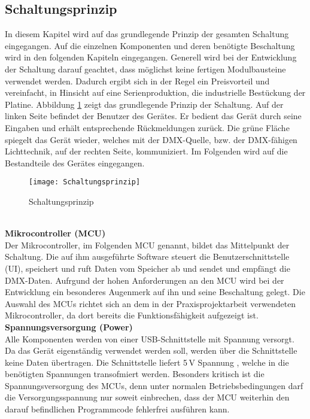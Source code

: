 
\subsection{Schaltungsprinzip}

In diesem Kapitel wird auf das grundlegende Prinzip der gesamten Schaltung eingegangen. Auf die einzelnen Komponenten und deren benötigte Beschaltung wird in den folgenden Kapiteln eingegangen. Generell wird bei der Entwicklung der Schaltung darauf geachtet, dass möglichst keine fertigen Modulbausteine verwendet werden. Dadurch ergibt sich in der Regel ein Preisvorteil und vereinfacht, in Hinsicht auf eine Serienproduktion, die industrielle Bestückung der Platine.%
Abbildung \ref{fig:Schaltungsrinzip} zeigt das grundlegende Prinzip der Schaltung. Auf der linken Seite befindet der Benutzer des Gerätes. Er bedient das Gerät durch seine Eingaben und erhält entsprechende Rückmeldungen zurück. Die grüne Fläche spiegelt das Gerät wieder, welches mit der DMX-Quelle, bzw. der DMX-fähigen Lichttechnik, auf der rechten Seite, kommuniziert. Im Folgenden wird auf die Bestandteile des Gerätes eingegangen.
\begin{figure}[h]
	\texttt{[image: Schaltungsprinzip]}
	\caption{Schaltungsprinzip}
	\label{fig:Schaltungsrinzip}
\end{figure}\\
\textbf{Mikrocontroller (MCU)}\\
Der Mikrocontroller, im Folgenden MCU genannt, bildet das Mittelpunkt der Schaltung. Die auf ihm ausgeführte Software steuert die Benutzerschnittstelle (UI), speichert und ruft Daten vom Speicher ab und sendet und empfängt die DMX-Daten. Aufrgund der hohen Anforderungen an den MCU wird bei der Entwicklung ein besonderes Augenmerk auf ihn und seine Beschaltung gelegt. Die Auswahl des MCUs richtet sich an dem in der Praxisprojektarbeit verwendeten Mikrocontroller, da dort bereits die Funktionsfähigkeit aufgezeigt ist.\\
\newline
\textbf{Spannungsversorgung (Power)}\\
Alle Komponenten werden von einer USB-Schnittstelle mit Spannung versorgt. Da das Gerät eigenständig verwendet werden soll, werden über die Schnittstelle keine Daten übertragen. Die Schnittstelle liefert 5\,V Spannung \cite[S. 44]{USB-Battery}, welche in die benötigten Spannungen transofmiert werden. Besonders kritisch ist die Spannungsversorgung des MCUs, denn unter normalen Betriebsbedingungen darf die Versorgungsspannung nur soweit einbrechen, dass der MCU weiterhin den darauf befindlichen Programmcode fehlerfrei ausführen kann.\\
